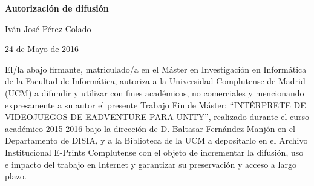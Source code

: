 
\newpage

\thispagestyle{empty}

\begin{center}

{\bf \Huge Autorización de difusión}

\vspace{1cm}


   \large Iván José Pérez Colado\\

   \vspace{0.5cm}


   24 de Mayo de 2016\\

   \vspace{0.5cm}
   \end{center}
   
El/la abajo firmante, matriculado/a en el Máster en Investigación en Informática de la Facultad de Informática, autoriza a la Universidad Complutense de Madrid (UCM) a difundir y utilizar con fines académicos, no comerciales y mencionando expresamente a su autor el presente Trabajo Fin de Máster: “INTÉRPRETE DE VIDEOJUEGOS DE EADVENTURE PARA UNITY”, realizado durante el curso académico 2015-2016 bajo la dirección de D. Baltasar Fernández Manjón en el Departamento de DISIA, y a la Biblioteca de la UCM a depositarlo en el Archivo Institucional E-Prints Complutense con el objeto de incrementar la difusión, uso e impacto del trabajo en Internet y garantizar su preservación y acceso a largo plazo.


